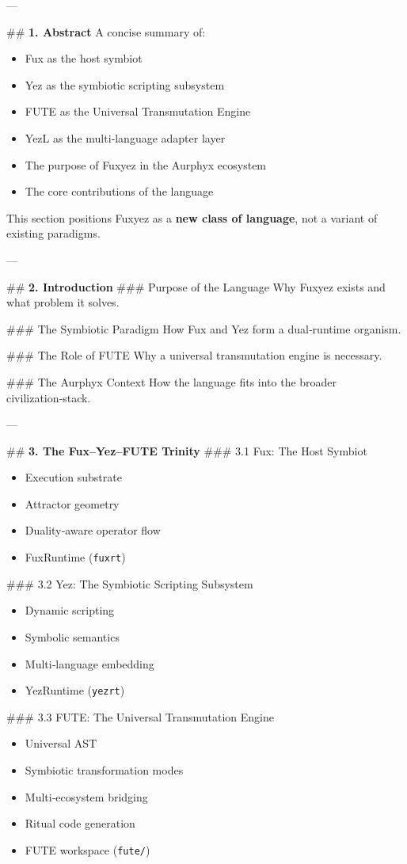 \begin{enumerate}
---

\#\# \textbf{1. Abstract}
A concise summary of:
\begin{itemize}
  \item Fux as the host symbiot  
  \item Yez as the symbiotic scripting subsystem  
  \item FUTE as the Universal Transmutation Engine  
  \item YezL as the multi‑language adapter layer  
  \item The purpose of Fuxyez in the Aurphyx ecosystem  
  \item The core contributions of the language  
\end{itemize}

This section positions Fuxyez as a \textbf{new class of language}, not a variant of existing paradigms.

---

\#\# \textbf{2. Introduction}
\#\#\# Purpose of the Language  
Why Fuxyez exists and what problem it solves.

\#\#\# The Symbiotic Paradigm  
How Fux and Yez form a dual‑runtime organism.

\#\#\# The Role of FUTE  
Why a universal transmutation engine is necessary.

\#\#\# The Aurphyx Context  
How the language fits into the broader civilization‑stack.

---

\#\# \textbf{3. The Fux–Yez–FUTE Trinity}
\#\#\# 3.1 Fux: The Host Symbiot  
\begin{itemize}
  \item Execution substrate  
  \item Attractor geometry  
  \item Duality‑aware operator flow  
  \item FuxRuntime (\texttt{fuxrt})
\end{itemize}

\#\#\# 3.2 Yez: The Symbiotic Scripting Subsystem  
\begin{itemize}
  \item Dynamic scripting  
  \item Symbolic semantics  
  \item Multi‑language embedding  
  \item YezRuntime (\texttt{yezrt})
\end{itemize}

\#\#\# 3.3 FUTE: The Universal Transmutation Engine  
\begin{itemize}
  \item Universal AST  
  \item Symbiotic transformation modes  
  \item Multi‑ecosystem bridging  
  \item Ritual code generation  
  \item FUTE workspace (\texttt{fute/})
\end{itemize}


\end{enumerate}
